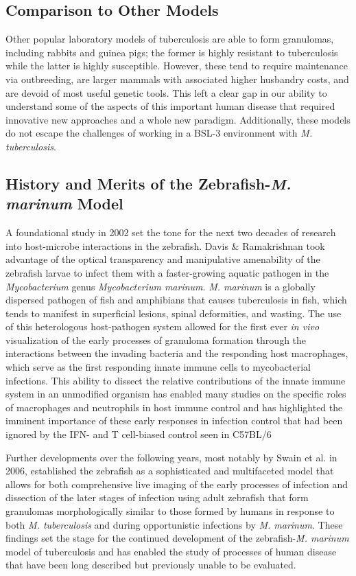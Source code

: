 \subsection{Comparison to Other Models}

Other popular laboratory models of tuberculosis are able to form granulomas, including rabbits and guinea pigs; the former is highly resistant to tuberculosis while the latter is highly susceptible. However, these tend to require maintenance via outbreeding, are larger mammals with associated higher husbandry costs, and are devoid of most useful genetic tools. This left a clear gap in our ability to understand some of the aspects of this important human disease that required innovative new approaches and a whole new paradigm. Additionally, these models do not escape the challenges of working in a BSL-3 environment with \textit{M. tuberculosis}. 

\subsection{History and Merits of the Zebrafish-\textit{M. marinum} Model}

A foundational study in 2002 set the tone for the next two decades of research into host-microbe interactions in the zebrafish. Davis \& Ramakrishnan took advantage of the optical transparency and manipulative amenability of the zebrafish larvae to infect them with a faster-growing aquatic pathogen in the \textit{Mycobacterium} genus \textit{Mycobacterium marinum}. \textit{M. marinum} is a globally dispersed pathogen of fish and amphibians that causes tuberculosis in fish, which tends to manifest in superficial lesions, spinal deformities, and wasting. The use of this heterologous host-pathogen system allowed for the first ever \textit{in vivo} visualization of the early processes of granuloma formation through the interactions between the invading bacteria and the responding host macrophages, which serve as the first responding innate immune cells to mycobacterial infections. This ability to dissect the relative contributions of the innate immune system in an unmodified organism has enabled many studies on the specific roles of macrophages and neutrophils in host immune control and has highlighted the imminent importance of these early responses in infection control that had been ignored by the IFN-\textgamma{} and T cell-biased control seen in C57BL/6

Further developments over the following years, most notably by Swain et al. in 2006, established the zebrafish as a sophisticated and multifaceted model that allows for both comprehensive live imaging of the early processes of infection and dissection of the later stages of infection using adult zebrafish that form granulomas morphologically similar to those formed by humans in response to both \textit{M. tuberculosis} and during opportunistic infections by \textit{M. marinum}. These findings set the stage for the continued development of the zebrafish-\textit{M. marinum} model of tuberculosis and has enabled the study of processes of human disease that have been long described but previously unable to be evaluated.

